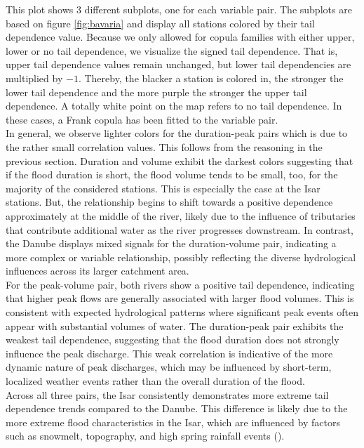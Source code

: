 \documentclass[
]{krantz}
\begin{document}
This plot shows \(3\) different subplots, one for each variable pair.
The subplots are based on figure \ref{fig:bavaria} and display all stations colored by their
tail dependence value.
Because we only allowed for copula families with either upper, lower or no tail dependence,
we visualize the signed tail dependence.
That is, upper tail dependence values remain unchanged, but lower tail dependencies are multiplied by
\(-1\). Thereby, the blacker a station is colored in, the stronger the lower tail dependence and the more
purple the stronger the upper tail dependence. A totally white point on the map refers to no tail dependence.
In these cases, a Frank copula has been fitted to the variable pair.\\
In general, we observe lighter colors for the duration-peak pairs which is due to the rather
small correlation values. This follows from the reasoning in the previous section.
Duration and volume exhibit the darkest colors suggesting that if the flood duration is short, the
flood volume tends to be small, too, for the majority of the considered stations.
This is especially the case at the Isar stations. But, the relationship begins to shift towards a positive dependence approximately at the middle of the river, likely due to the influence of tributaries that contribute additional water as the river progresses downstream.
In contrast, the Danube displays mixed signals for the duration-volume pair, indicating a more complex or variable relationship, possibly reflecting the diverse hydrological influences across its larger catchment area.\\
For the peak-volume pair, both rivers show a positive tail dependence, indicating that higher peak flows are generally associated with larger flood volumes. This is consistent with expected hydrological patterns where significant peak events often appear with substantial volumes of water. The duration-peak pair exhibits the weakest tail dependence, suggesting that the flood duration does not strongly influence the peak discharge. This weak correlation is indicative of the more dynamic nature of peak discharges, which may be influenced by short-term, localized weather events rather than the overall duration of the flood.\\
Across all three pairs, the Isar consistently demonstrates more extreme tail dependence trends compared to the Danube. This difference is likely due to the more extreme flood characteristics in the Isar, which are influenced by factors such as snowmelt, topography, and high spring rainfall events (\citet{parajkaa2019}).
\end{document}
